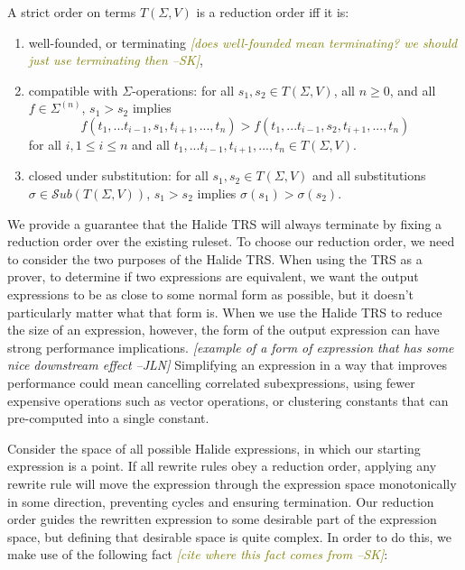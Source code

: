 \documentclass[sigplan,10pt,review,anonymous]{acmart}\settopmatter{printfolios=true,printccs=false,printacmref=false}
\newcommand{\jln}[1]{\textcolor{uwpurple}{\textit{[{#1} --JLN]}}}
\newcommand{\sak}[1]{\textcolor{olive}{\textit{[{#1} --SK]}}}
\begin{document}
\begin{definition}
A strict order on terms $T(\Sigma, V)$ is a reduction order iff it is: 
\begin{enumerate}
    \item well-founded, or terminating \sak{does well-founded mean terminating?  we should just use terminating then},
    \item compatible with $\Sigma$-operations: for all $s_1, s_2 \in T(\Sigma,V)$, all $n \geq 0$, and all $f \in \Sigma^{(n)}$, $s_1 > s_2$ implies
    \[ f(t_1,...t_{i-1},s_1,t_{i+1},...,t_n) > f(t_1,...t_{i-1},s_2,t_{i+1},...,t_n)
    \]
    for all $i, 1 \leq i \leq n$ and all $t_1,...t_{i-1},t_{i+1},...,t_n \in T(\Sigma,V)$.
    \item closed under substitution: for all $s_1, s_2 \in T(\Sigma,V)$ and all substitutions $\sigma \in \mathcal{S}ub(T(\Sigma,V))$, $s_1 > s_2$ implies $\sigma(s_1) > \sigma(s_2)$.
\end{enumerate}
\end{definition}

We provide a guarantee that the Halide TRS will always terminate by fixing a
reduction order over the existing ruleset. To choose our reduction order, we
need to consider the two purposes of the Halide TRS. When using the TRS
as a prover, to determine if two expressions are equivalent, we want
the output expressions to be as close to some normal form as possible, but it
doesn't particularly matter what that form is. When we use the Halide TRS
to reduce the size of an expression, however, the form of the output expression
can have strong performance implications. \jln{example of a form of expression that has some nice downstream effect}
Simplifying an expression in a way that
improves performance could mean cancelling correlated subexpressions, using
fewer expensive operations such as vector operations, or clustering constants
that can pre-computed into a single constant.

Consider the space of all possible Halide expressions, in which our starting
expression is a point. If all rewrite rules obey a reduction order, applying any
rewrite rule will move the expression through the expression space monotonically
in some direction, preventing cycles and ensuring termination. Our reduction
order guides the rewritten expression to some desirable part of the
expression space, but defining that desirable space is quite complex. In order
to do this, we make use of the following fact \sak{cite where this fact comes from}:
\end{document}
